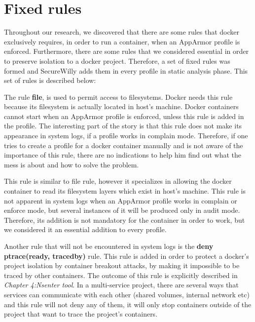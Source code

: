 \section{Fixed rules}

Throughout our research, we discovered that there are some rules that docker exclusively requires, in order to run a container, when an AppArmor profile is enforced. Furthermore, there are some rules that we considered essential in order to preserve isolation to a docker project. Therefore, a set of fixed rules was formed and SecureWilly adds them in every profile in static analysis phase. This set of rules is described below:

\begin{description}[style=nextline]
\item[file rule]
The rule \textbf{file}, is used to permit access to filesystems. Docker needs this rule because its filesystem is actually located in host's machine. Docker containers cannot start when an AppArmor profile is enforced, unless this rule is added in the profile. The interesting part of the story is that this rule does not make its appearance in system logs, if a profile works in complain mode. Therefore, if one tries to create a profile for a docker container manually and is not aware of the importance of this rule, there are no indications to help him find out what the mess is about and how to solve the problem.

\item[/var/lib/docker/* r]
This rule is similar to file rule, however it specializes in allowing the docker container to read its filesystem layers which exist in host's machine. This rule is not apparent in system logs when an AppArmor profile works in complain or enforce mode, but several instances of it will be produced only in audit mode. Therefore, its addition is not mandatory for the container in order to work, but we considered it an essential addition to every profile.

\item[deny ptrace(ready, tracedby)]
Another rule that will not be encountered in system logs is the \textbf{deny ptrace(ready, tracedby)} rule. This rule is added in order to protect a docker's project isolation by container breakout attacks, by making it impossible to be traced by other containers. The outcome of this rule is explicitly described in \textit{Chapter 4:Nsenter tool}. In a multi-service project, there are several ways that services can communicate with each other (shared volumes, internal network etc) and this rule will not deny any of them, it will only stop containers outside of the project that want to trace the project's containers.
\end{description}

